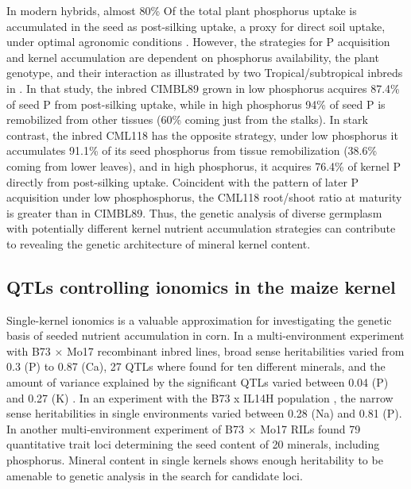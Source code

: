 In modern hybrids, almost 80\% Of the total plant phosphorus uptake is accumulated in the seed as post-silking uptake, a proxy for direct soil uptake, under optimal agronomic conditions \citep{bender2013}. 
However, the strategies for P acquisition and kernel accumulation are dependent on phosphorus availability, the plant genotype, and their interaction as illustrated by two Tropical/subtropical inbreds in \citep{sun2023}. 
In that study, the inbred CIMBL89 grown in low phosphorus acquires 87.4\% of seed P from post-silking uptake, while in high phosphorus 94\% of seed P is remobilized from other tissues (60\% coming just from the stalks).
In stark contrast, the inbred CML118 has the opposite strategy, under low phosphorus it accumulates 91.1\% of its seed phosphorus from tissue remobilization (38.6\% coming from lower leaves), and in high phosphorus, it acquires 76.4\% of kernel P directly from post-silking uptake. 
Coincident with the pattern of later P acquisition under low phosphosphorus,  the CML118 root/shoot ratio at maturity is greater than in CIMBL89. 
Thus, the genetic analysis of diverse germplasm with potentially different kernel nutrient accumulation strategies can contribute to revealing the genetic architecture of mineral kernel content.

\subsection{QTLs controlling ionomics in the maize kernel}

Single-kernel ionomics is a valuable approximation for investigating the genetic basis of seeded nutrient accumulation in corn. 
In a multi-environment experiment with B73 $\times$ Mo17 recombinant inbred lines, broad sense heritabilities varied from 0.3 (P) to 0.87 (Ca), 27 QTLs where found for ten different minerals, and the amount of variance explained by the significant QTLs varied between 0.04 (P) and 0.27 (K) \citep{baxter2013}. 
In an experiment with the B73 x IL14H population \citep{baxter2014}, the narrow sense heritabilities in single environments varied between 0.28 (Na) and 0.81 (P). In another multi-environment experiment of B73 $\times$ Mo17 RILs \citep{asaro2016} found 79 quantitative trait loci determining the seed content of 20 minerals, including phosphorus. 
Mineral content in single kernels shows enough heritability to be amenable to genetic analysis in the search for candidate loci.

